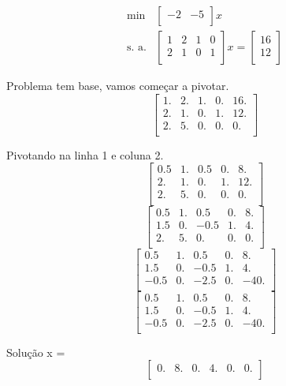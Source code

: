\documentclass[a4paper,12pt]{article}
\begin{document}
\begin{eqnarray*} \min & \begin{bmatrix}
  -2 & -5\\
\end{bmatrix}x \\\text{s. a.} &\begin{bmatrix}
  1 & 2 & 1 & 0\\
  2 & 1 & 0 & 1\\
\end{bmatrix}x = \begin{bmatrix}
  16\\
  12\\
\end{bmatrix}\end{eqnarray*}
\par 
\par Problema tem base, vamos começar a pivotar.
\[\begin{bmatrix}
  1. & 2. & 1. & 0. & 16.\\
  2. & 1. & 0. & 1. & 12.\\
  2. & 5. & 0. & 0. & 0.\\
\end{bmatrix}\]
\par Pivotando na linha 1 e coluna 2.
\[\begin{bmatrix}
  0.5 & 1. & 0.5 & 0. & 8.\\
  2. & 1. & 0. & 1. & 12.\\
  2. & 5. & 0. & 0. & 0.\\
\end{bmatrix}\]
\[\begin{bmatrix}
  0.5 & 1. & 0.5 & 0. & 8.\\
  1.5 & 0. & -0.5 & 1. & 4.\\
  2. & 5. & 0. & 0. & 0.\\
\end{bmatrix}\]
\[\begin{bmatrix}
  0.5 & 1. & 0.5 & 0. & 8.\\
  1.5 & 0. & -0.5 & 1. & 4.\\
  -0.5 & 0. & -2.5 & 0. & -40.\\
\end{bmatrix}\]
\[\begin{bmatrix}
  0.5 & 1. & 0.5 & 0. & 8.\\
  1.5 & 0. & -0.5 & 1. & 4.\\
  -0.5 & 0. & -2.5 & 0. & -40.\\
\end{bmatrix}\]
\par Solução x =
\[\begin{bmatrix}
  0. & 8. & 0. & 4. & 0. & 0.\\
\end{bmatrix}\]
\end{document}
